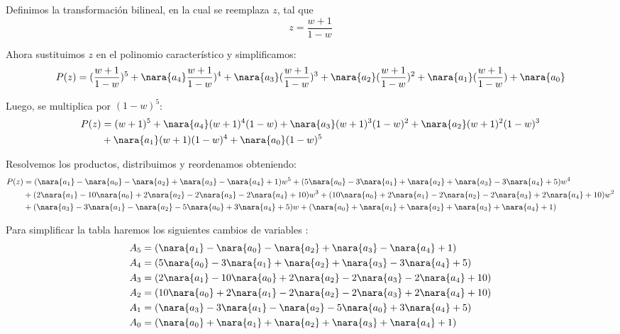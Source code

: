 Definimos la transformación bilineal, en la cual se reemplaza $z$, tal que 
\begin{equation}
    z = \frac{w+1}{1-w}
\end{equation}

Ahora sustituimos $z$ en el polinomio característico y simplificamos:
\begin{equation}
    P(z) = (\frac{w+1}{1-w})^5 +\nara{a_4}\frac{w+1}{1-w})^4 + \nara{a_3}(\frac{w+1}{1-w})^3 + \nara{a_2} (\frac{w+1}{1-w})^2 + \nara{a_1} (\frac{w+1}{1-w}) + \nara{a_0}
\end{equation}

Luego, se multiplica por $(1-w)^5$:
\begin{align}
    P(z) &=  ({w+1})^5 +\nara{a_4}({w+1})^4(1-w)+ \nara{a_3}({w+1})^3(1-w)^2 + \nara{a_2} ({w+1})^2 (1-w)^3 \\
    &+ \nara{a_1} ({w+1})(1-w)^4+ \nara{a_0}(1-w)^5
\end{align}

Resolvemos los productos, distribuimos y reordenamos obteniendo:
\begin{align}
  P(z) &= (\nara{a_1} - \nara{a_0} - \nara{a_2} + \nara{a_3} - \nara{a_4} + 1) w^5 + (5\nara{a_0} - 3\nara{a_1} + \nara{a_2} + \nara{a_3} - 3\nara{a_4} + 5) w^4 \\
  &+ (2\nara{a_1} - 10\nara{a_0} + 2\nara{a_2} - 2\nara{a_3} - 2\nara{a_4} + 10) w^3 + (10\nara{a_0} + 2\nara{a_1} - 2\nara{a_2} - 2\nara{a_3} + 2\nara{a_4} + 10) w^2 \\
  &+ (\nara{a_3} - 3\nara{a_1} - \nara{a_2} - 5\nara{a_0} + 3\nara{a_4} + 5) w + (\nara{a_0} + \nara{a_1} + \nara{a_2} + \nara{a_3} + \nara{a_4} + 1)
\end{align}

Para simplificar la tabla haremos los siguientes cambios de variables :
\begin{align}
    A_5&= (\nara{a_1} - \nara{a_0} - \nara{a_2} + \nara{a_3} - \nara{a_4} + 1)\\
    A_4 &=(5\nara{a_0} - 3\nara{a_1} + \nara{a_2} + \nara{a_3} - 3\nara{a_4} + 5) \\
    A_3 &= (2\nara{a_1} - 10\nara{a_0} + 2\nara{a_2} - 2\nara{a_3} - 2\nara{a_4} + 10)\\
    A_2 &=(10\nara{a_0} + 2\nara{a_1} - 2\nara{a_2} - 2\nara{a_3} + 2\nara{a_4} + 10)\\
    A_1 &=(\nara{a_3} - 3\nara{a_1} - \nara{a_2} - 5\nara{a_0} + 3\nara{a_4} + 5)\\
    A_0 &= (\nara{a_0} + \nara{a_1} + \nara{a_2} + \nara{a_3} + \nara{a_4} + 1)
\end{align}

